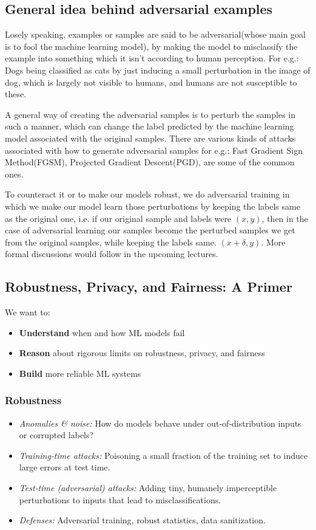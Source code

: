 \documentclass[11pt]{article}
\theoremstyle{plain} %
\begin{document}
\subsection{\Large{\bfseries General idea behind adversarial examples}}
Losely speaking, examples or samples are said to be adversarial(whose main goal is to fool the machine learning model), by making the model to misclassify the example into something which it isn't according to human perception. For e.g.: Dogs being classified as cats by just inducing a small perturbation in the image of dog, which is largely not visible to humans, and humans are not susceptible to these.

A general way of creating the adversarial samples is to perturb the samples in such a manner, which can change the label predicted by the machine learning model associated with the original samples. There are various kinds of attacks associated with how to generate adversarial samples for e.g.: Fast Gradient Sign Method(FGSM), Projected Gradient Descent(PGD), are some of the common ones.

To counteract it or to make our models robust, we do adversarial training in which we make our model learn those perturbations by keeping the labels same as the original one, i.e. if our original sample and labels  were $(x,y)$, then in the case of adversarial learning our samples become the perturbed samples we get from the original samples, while keeping the labels same. $(x + \delta, y)$.
More formal discussions would follow in the upcoming lectures.

\subsection{\Large{\bfseries Robustness, Privacy, and Fairness: A Primer}}

We want to:
\begin{itemize}
  \item \textbf{Understand} when and how ML models fail
  \item \textbf{Reason} about rigorous limits on robustness, privacy, and fairness
  \item \textbf{Build} more reliable ML systems
\end{itemize}

\subsubsection*{Robustness}
\begin{itemize}
  \item \emph{Anomalies \& noise:} How do models behave under out‐of‐distribution inputs or corrupted labels?
  \item \emph{Training‐time attacks:} Poisoning a small fraction of the training set to induce large errors at test time.
  \item \emph{Test‐time (adversarial) attacks:} Adding tiny, humanely imperceptible perturbations to inputs that lead to misclassifications.
  \item \emph{Defenses:} Adversarial training, robust statistics, data sanitization.
\end{itemize}
\end{document}
